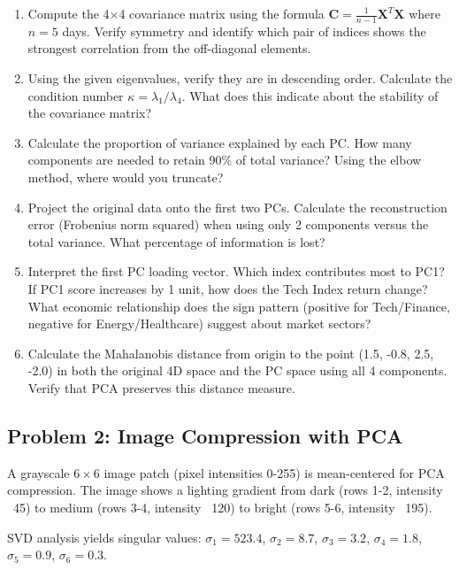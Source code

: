 \documentclass[12pt]{article}
\begin{document}
\begin{enumerate}[label=(\alph*)]
\item Compute the 4×4 covariance matrix using the formula $\mathbf{C} = \frac{1}{n-1}\mathbf{X}^T\mathbf{X}$ where $n=5$ days. Verify symmetry and identify which pair of indices shows the strongest correlation from the off-diagonal elements.

\item Using the given eigenvalues, verify they are in descending order. Calculate the condition number $\kappa = \lambda_1/\lambda_4$. What does this indicate about the stability of the covariance matrix?

\item Calculate the proportion of variance explained by each PC. How many components are needed to retain 90\% of total variance? Using the elbow method, where would you truncate?

\item Project the original data onto the first two PCs. Calculate the reconstruction error (Frobenius norm squared) when using only 2 components versus the total variance. What percentage of information is lost?

\item Interpret the first PC loading vector. Which index contributes most to PC1? If PC1 score increases by 1 unit, how does the Tech Index return change? What economic relationship does the sign pattern (positive for Tech/Finance, negative for Energy/Healthcare) suggest about market sectors?

\item Calculate the Mahalanobis distance from origin to the point (1.5, -0.8, 2.5, -2.0) in both the original 4D space and the PC space using all 4 components. Verify that PCA preserves this distance measure.
\end{enumerate}

\subsection*{Problem 2: Image Compression with PCA}

A grayscale $6 \times 6$ image patch (pixel intensities 0-255) is mean-centered for PCA compression. The image shows a lighting gradient from dark (rows 1-2, intensity ~45) to medium (rows 3-4, intensity ~120) to bright (rows 5-6, intensity ~195).

SVD analysis yields singular values: $\sigma_1 = 523.4$, $\sigma_2 = 8.7$, $\sigma_3 = 3.2$, $\sigma_4 = 1.8$, $\sigma_5 = 0.9$, $\sigma_6 = 0.3$.
\end{document}
